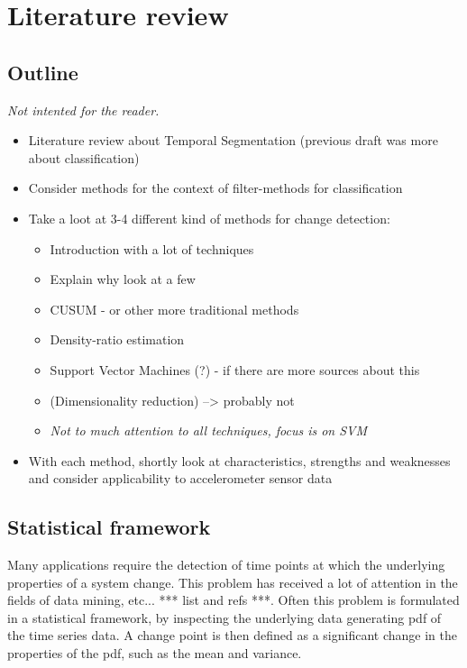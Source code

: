 
\chapter{Literature review}

\label{Chapter2} %


\section{Outline}
\emph{Not intented for the reader.}
\begin{itemize}
  \item Literature review about Temporal Segmentation (previous draft was more about classification)
  \item Consider methods for the context of filter-methods for classification
  \item Take a loot at 3-4 different kind of methods for change detection:
    \begin{itemize}
      \item Introduction with a lot of techniques
      \item Explain why look at a few
      \item CUSUM - or other more traditional methods
      \item Density-ratio estimation
      \item Support Vector Machines (?) - if there are more sources about this
      \item (Dimensionality reduction) --> probably not
      \item \emph{Not to much attention to all techniques, focus is on SVM}
    \end{itemize}
  \item With each method, shortly look at characteristics, strengths and weaknesses and consider applicability to accelerometer sensor data
\end{itemize}


\section{Statistical framework}\label{statistical-framework}
Many applications require the detection of time points at which the underlying properties of a system change.
This problem has received a lot of attention in the fields of data mining, etc... *** list and refs ***.
Often this problem is formulated in a statistical framework, by inspecting the underlying data generating \gls{pdf} of the time series data.
A change point is then defined as a significant change in the properties of the \gls{pdf}, such as the mean and variance.

